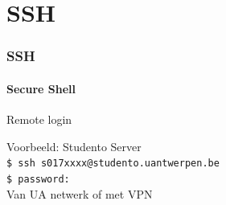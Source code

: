 

\section{SSH}
\begin{frame}
    \frametitle{SSH}
	\framesubtitle{\textbf{S}ecure \textbf{Sh}ell}
    
	Remote login \\
    
    \vspace{1cm}
    
    Voorbeeld: Studento Server \\
    \texttt{\$ ssh s017xxxx@studento.uantwerpen.be} \\
    \texttt{\$ password: } \\

	\vspace{1cm}
    Van UA netwerk of met VPN
\end{frame}

